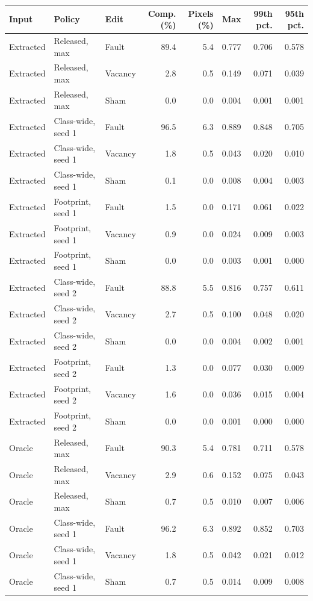 \begin{tabular}{lllrrrrr}
\toprule
Input & Policy & Edit & Comp. (\%) & Pixels (\%) & Max & 99th pct. & 95th pct. \\
\midrule
Extracted & Released, max & Fault & 89.4 & 5.4 & 0.777 & 0.706 & 0.578 \\
Extracted & Released, max & Vacancy & 2.8 & 0.5 & 0.149 & 0.071 & 0.039 \\
Extracted & Released, max & Sham & 0.0 & 0.0 & 0.004 & 0.001 & 0.001 \\
Extracted & Class-wide, seed 1 & Fault & 96.5 & 6.3 & 0.889 & 0.848 & 0.705 \\
Extracted & Class-wide, seed 1 & Vacancy & 1.8 & 0.5 & 0.043 & 0.020 & 0.010 \\
Extracted & Class-wide, seed 1 & Sham & 0.1 & 0.0 & 0.008 & 0.004 & 0.003 \\
Extracted & Footprint, seed 1 & Fault & 1.5 & 0.0 & 0.171 & 0.061 & 0.022 \\
Extracted & Footprint, seed 1 & Vacancy & 0.9 & 0.0 & 0.024 & 0.009 & 0.003 \\
Extracted & Footprint, seed 1 & Sham & 0.0 & 0.0 & 0.003 & 0.001 & 0.000 \\
Extracted & Class-wide, seed 2 & Fault & 88.8 & 5.5 & 0.816 & 0.757 & 0.611 \\
Extracted & Class-wide, seed 2 & Vacancy & 2.7 & 0.5 & 0.100 & 0.048 & 0.020 \\
Extracted & Class-wide, seed 2 & Sham & 0.0 & 0.0 & 0.004 & 0.002 & 0.001 \\
Extracted & Footprint, seed 2 & Fault & 1.3 & 0.0 & 0.077 & 0.030 & 0.009 \\
Extracted & Footprint, seed 2 & Vacancy & 1.6 & 0.0 & 0.036 & 0.015 & 0.004 \\
Extracted & Footprint, seed 2 & Sham & 0.0 & 0.0 & 0.001 & 0.000 & 0.000 \\
\midrule
Oracle & Released, max & Fault & 90.3 & 5.4 & 0.781 & 0.711 & 0.578 \\
Oracle & Released, max & Vacancy & 2.9 & 0.6 & 0.152 & 0.075 & 0.043 \\
Oracle & Released, max & Sham & 0.7 & 0.5 & 0.010 & 0.007 & 0.006 \\
Oracle & Class-wide, seed 1 & Fault & 96.2 & 6.3 & 0.892 & 0.852 & 0.703 \\
Oracle & Class-wide, seed 1 & Vacancy & 1.8 & 0.5 & 0.042 & 0.021 & 0.012 \\
Oracle & Class-wide, seed 1 & Sham & 0.7 & 0.5 & 0.014 & 0.009 & 0.008 \\

\end{tabular}
